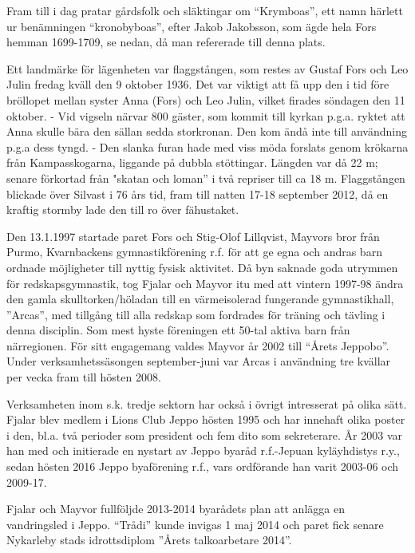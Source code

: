 Fram till i dag pratar gårdsfolk och släktingar om ``Krymboas'', ett namn härlett ur benämningen ``kronobyboas'', efter Jakob Jakobsson, som ägde hela Fors hemman 1699-1709, se nedan, då man refererade till denna plats.

Ett landmärke för lägenheten var flaggstången, som restes av Gustaf Fors och Leo Julin fredag kväll den 9 oktober 1936. Det var viktigt att få upp den i tid före bröllopet mellan syster Anna (Fors) och Leo Julin, vilket firades söndagen den 11 oktober. - Vid vigseln närvar 800 gäster, som kommit till kyrkan p.g.a. ryktet att Anna skulle bära den sällan sedda storkronan. Den kom ändå inte till användning p.g.a dess tyngd. - Den slanka furan hade med viss möda forslats genom krökarna från Kampasskogarna, liggande på dubbla stöttingar. Längden var då 22 m; senare förkortad från "skatan och loman” i två repriser till ca 18 m. Flaggstången blickade över Silvast i 76 års tid, fram till natten 17-18 september 2012, då en kraftig stormby lade den till ro över fähustaket.

Den 13.1.1997 startade paret Fors och Stig-Olof Lillqvist, Mayvors bror från Purmo, Kvarnbackens gymnastikförening r.f. för att ge egna och andras barn ordnade möjligheter till nyttig fysisk aktivitet. Då byn saknade goda utrymmen för redskapsgymnastik, tog Fjalar och Mayvor itu med att vintern 1997-98 ändra den gamla skulltorken/höladan till en värmeisolerad fungerande gymnastikhall, ”Arcas”, med tillgång till alla redskap som fordrades för träning och tävling i denna disciplin. Som mest hyste föreningen ett 50-tal aktiva barn från närregionen. För sitt engagemang valdes Mayvor år 2002 till ``Årets Jeppobo''. Under verksamhetssäsongen september-juni var Arcas i användning tre kvällar per vecka fram till hösten 2008.

Verksamheten inom s.k. tredje sektorn har också i övrigt intresserat på olika sätt. Fjalar blev medlem i Lions Club Jeppo hösten 1995 och har innehaft olika poster i den, bl.a. två perioder som president och fem dito som sekreterare. År 2003 var han med och initierade en nystart av Jeppo byaråd r.f.-Jepuan kyläyhdistys r.y., sedan hösten 2016 Jeppo byaförening r.f., vars ordförande han varit 2003-06 och 2009-17.

Fjalar och Mayvor fullföljde 2013-2014 byarådets plan att anlägga en vandringsled i Jeppo. ``Trådi'' kunde invigas 1 maj 2014 och paret fick senare Nykarleby stads idrottsdiplom ”Årets talkoarbetare 2014”.



